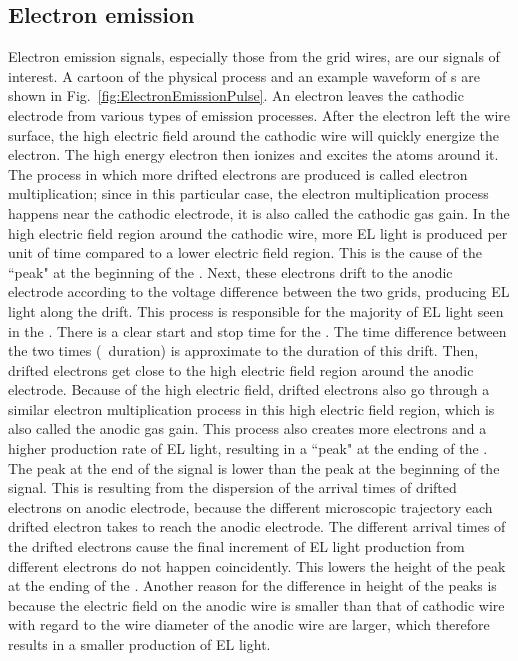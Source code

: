 \subsection{Electron emission} 
\label{sec:events ee}
Electron emission signals, especially those from the grid wires, are our signals of interest. A cartoon of the physical process and an example waveform of \ees s are shown in Fig.~\ref{fig:ElectronEmissionPulse}. An electron leaves the cathodic electrode from various types of emission processes. After the electron left the wire surface, the high electric field around the cathodic wire will quickly energize the electron. The high energy electron then ionizes and excites the atoms around it. The process in which more drifted electrons are produced is called electron multiplication; since in this particular case, the electron multiplication process happens near the cathodic electrode, it is also called the cathodic gas gain. In the high electric field region around the cathodic wire, more EL light is produced per unit of time compared to a lower electric field region. This is the cause of the ``peak" at the beginning of the \ees .  Next, these electrons drift to the anodic electrode according to the voltage difference between the two grids, producing EL light along the drift. This process is responsible for the majority of EL light seen in the \ees . There is a clear start and stop time for the \ees . The time difference between the two times (\ees\ duration) is approximate to the duration of this drift. Then, drifted electrons get close to the high electric field region around the anodic electrode. Because of  the high electric field, drifted electrons also go through a similar electron multiplication process in this high electric field region, which is also called the anodic gas gain. This process also creates more electrons and a higher production rate of EL light, resulting in a ``peak" at the ending of the \ees . The peak at the end of the signal is lower than the peak at the beginning of the signal. This is resulting from the dispersion of the arrival times of drifted electrons on anodic electrode, because the different microscopic trajectory each drifted electron takes to reach the anodic electrode. The different arrival times of the drifted electrons cause the final increment of EL light production from different electrons do not happen coincidently. This lowers the height of the peak at the ending of the \ees . Another reason for the difference in height of the peaks is because the electric field on the anodic wire is smaller than that of cathodic wire with regard to the wire diameter of the anodic wire are larger, which therefore results in a smaller production of EL light.

